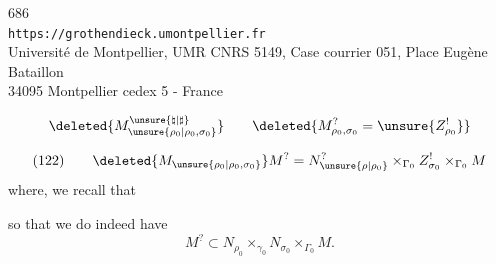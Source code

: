 \begin{center}
686\\
\texttt{https://grothendieck.umontpellier.fr}\\
Université de Montpellier, UMR CNRS 5149, Case courrier 051, Place Eugène Bataillon\\
34095 Montpellier cedex 5 - France
\end{center}



\[
\deleted{M_{\unsure{\rho_0|\rho_0,\sigma_0}}^{\unsure{\natural|\sharp}}}
\qquad
\deleted{M_{\rho_0,\sigma_0}^{?}=\unsure{Z_{\rho_0}^{!}}}
\]

\[
(122)\qquad
\deleted{M_{\unsure{\rho_0|\rho_0,\sigma_0}}}
M^?=N_{\unsure{\rho|\rho_0}}^?
\times_{\Gamma_0}Z_{\sigma_0}^!\times_{\Gamma_0}M
\]
where, we recall that


so that we do indeed have
\[
M^?\subset N_{\rho_0}\times_{\gamma_0}N_{\sigma_0}
\times_{\Gamma_0}M .
\]

